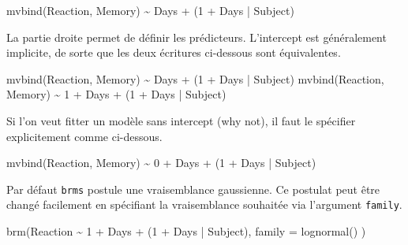 \documentclass[
  a4paper,11pt,twoside,onecolumn,openright,final,oldfontcommands]{memoir}
\newenvironment{Shaded}{\begin{snugshade}}{\end{snugshade}}
\newcommand{\AttributeTok}[1]{\textcolor[rgb]{0.77,0.63,0.00}{#1}}
\newcommand{\DecValTok}[1]{\textcolor[rgb]{0.00,0.00,0.81}{#1}}
\newcommand{\FunctionTok}[1]{\textcolor[rgb]{0.00,0.00,0.00}{#1}}
\newcommand{\NormalTok}[1]{#1}
\newcommand{\SpecialCharTok}[1]{\textcolor[rgb]{0.00,0.00,0.00}{#1}}
\theoremstyle{definition}
\theoremstyle{definition}
\theoremstyle{definition}
\theoremstyle{remark}
\begin{document}
\begin{Shaded}
\begin{Highlighting}[]
\FunctionTok{mvbind}\NormalTok{(Reaction, Memory) }\SpecialCharTok{\textasciitilde{}}\NormalTok{ Days }\SpecialCharTok{+}\NormalTok{ (}\DecValTok{1} \SpecialCharTok{+}\NormalTok{ Days }\SpecialCharTok{|}\NormalTok{ Subject)}
\end{Highlighting}
\end{Shaded}

La partie droite permet de définir les prédicteurs. L'intercept est généralement implicite, de sorte que les deux écritures ci-dessous sont équivalentes.

\begin{Shaded}
\begin{Highlighting}[]
\FunctionTok{mvbind}\NormalTok{(Reaction, Memory) }\SpecialCharTok{\textasciitilde{}}\NormalTok{ Days }\SpecialCharTok{+}\NormalTok{ (}\DecValTok{1} \SpecialCharTok{+}\NormalTok{ Days }\SpecialCharTok{|}\NormalTok{ Subject)}
\FunctionTok{mvbind}\NormalTok{(Reaction, Memory) }\SpecialCharTok{\textasciitilde{}} \DecValTok{1} \SpecialCharTok{+}\NormalTok{ Days }\SpecialCharTok{+}\NormalTok{ (}\DecValTok{1} \SpecialCharTok{+}\NormalTok{ Days }\SpecialCharTok{|}\NormalTok{ Subject)}
\end{Highlighting}
\end{Shaded}

Si l'on veut fitter un modèle sans intercept (why not), il faut le spécifier explicitement comme ci-dessous.

\begin{Shaded}
\begin{Highlighting}[]
\FunctionTok{mvbind}\NormalTok{(Reaction, Memory) }\SpecialCharTok{\textasciitilde{}} \DecValTok{0} \SpecialCharTok{+}\NormalTok{ Days }\SpecialCharTok{+}\NormalTok{ (}\DecValTok{1} \SpecialCharTok{+}\NormalTok{ Days }\SpecialCharTok{|}\NormalTok{ Subject)}
\end{Highlighting}
\end{Shaded}

Par défaut \texttt{brms} postule une vraisemblance gaussienne. Ce postulat peut être changé facilement en spécifiant la vraisemblance souhaitée via l'argument \texttt{family}.

\begin{Shaded}
\begin{Highlighting}[]
\FunctionTok{brm}\NormalTok{(Reaction }\SpecialCharTok{\textasciitilde{}} \DecValTok{1} \SpecialCharTok{+}\NormalTok{ Days }\SpecialCharTok{+}\NormalTok{ (}\DecValTok{1} \SpecialCharTok{+}\NormalTok{ Days }\SpecialCharTok{|}\NormalTok{ Subject), }\AttributeTok{family =} \FunctionTok{lognormal}\NormalTok{() )}
\end{Highlighting}
\end{Shaded}
\end{document}
